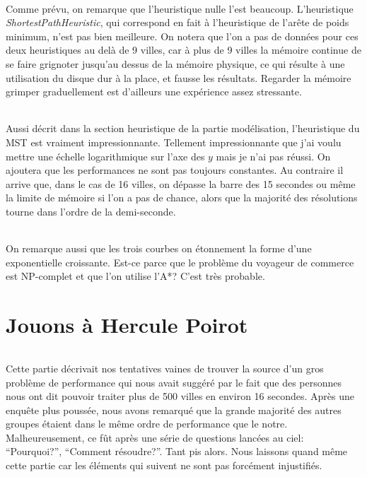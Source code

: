 \documentclass[french]{article}
\begin{document}
\paragraph{} Comme prévu, on remarque que l'heuristique nulle l'est beaucoup.
L'heuristique \emph{ShortestPathHeuristic}, qui correspond en fait à
l'heuristique de l'arête de poids minimum, n'est pas bien meilleure. On notera
que l'on a pas de données pour ces deux heuristiques au delà de 9 villes, car à
plus de 9 villes la mémoire continue de se faire grignoter jusqu'au dessus de
la mémoire physique, ce qui résulte à une utilisation du disque dur à la place,
et fausse les résultats. Regarder la mémoire grimper graduellement est
d'ailleurs une expérience assez stressante.

\paragraph{} Aussi décrit dans la section heuristique de la partie
modélisation, l'heuristique du MST est vraiment impressionnante. Tellement
impressionnante que j'ai voulu mettre une échelle logarithmique sur l'axe des
$y$ mais je n'ai pas réussi. On ajoutera que les performances ne sont pas
toujours constantes. Au contraire il arrive que, dans le cas de 16 villes, on
dépasse la barre des 15 secondes ou même la limite de mémoire si l'on a pas de
chance, alors que la majorité des résolutions tourne dans l'ordre de la
demi-seconde.

\paragraph{} On remarque aussi que les trois courbes on étonnement la forme
d'une exponentielle croissante. Est-ce parce que le problème du voyageur de
commerce est NP-complet et que l'on utilise l'A*? C'est très probable.

\part{Jouons à Hercule Poirot}

\paragraph{} Cette partie décrivait nos tentatives vaines de trouver la source
d'un gros problème de performance qui nous avait suggéré par le fait que des
personnes nous ont dit pouvoir traiter plus de 500 villes en environ 16
secondes. Après une enquête plus poussée, nous avons remarqué que la grande
majorité des autres groupes étaient dans le même ordre de performance que le
notre. Malheureusement, ce fût après une série de questions lancées au ciel:
``Pourquoi?'', ``Comment résoudre?''. Tant pis alors. Nous laissons quand même
cette partie car les éléments qui suivent ne sont pas forcément injustifiés.
\end{document}
